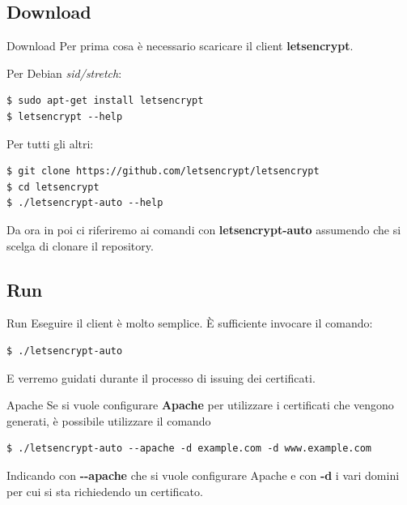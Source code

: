 \documentclass[xcolor=svgnames,11pt]{beamer}
\begin{document}
\subsection{Download}
\begin{frame}[fragile]{Download}
Per prima cosa è necessario scaricare il client \textbf{letsencrypt}.

\medskip\pause
Per Debian \emph{sid/stretch}:
\begin{block}{}
\begin{scriptsize}
\begin{verbatim}
$ sudo apt-get install letsencrypt
$ letsencrypt --help
\end{verbatim}
\end{scriptsize}
\end{block}

\medskip\pause
Per tutti gli altri:
\begin{block}{}
\begin{scriptsize}
\begin{verbatim}
$ git clone https://github.com/letsencrypt/letsencrypt
$ cd letsencrypt
$ ./letsencrypt-auto --help
\end{verbatim}
\end{scriptsize}
\end{block}

\medskip\pause

Da ora in poi ci riferiremo ai comandi con \textbf{letsencrypt-auto} assumendo che
si scelga di clonare il repository.

\end{frame}

\subsection{Run}
\begin{frame}[fragile]{Run}
Eseguire il client è molto semplice. È sufficiente invocare il comando:
\begin{block}{}
\begin{scriptsize}
\begin{verbatim}
$ ./letsencrypt-auto
\end{verbatim}
\end{scriptsize}
\end{block}
E verremo guidati durante il processo di issuing dei certificati.
\end{frame}

\begin{frame}[fragile]{Apache}
Se si vuole configurare \textbf{Apache} per utilizzare i certificati che vengono
generati, è possibile utilizzare il comando
\begin{block}{}
\begin{scriptsize}
\begin{verbatim}
$ ./letsencrypt-auto --apache -d example.com -d www.example.com
\end{verbatim}
\end{scriptsize}
\end{block}
Indicando con \textbf{-{}-apache} che si vuole configurare Apache e con \textbf{-d}
i vari domini per cui si sta richiedendo un certificato.
\end{frame}
\end{document}
